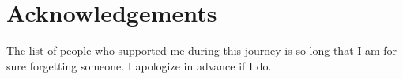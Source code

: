 \chapter*{Acknowledgements}

The list of people who supported me during this journey is so long that I am for sure forgetting someone. I apologize in advance if I do.


